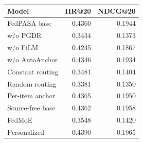 \par\noindent\begin{minipage}{\columnwidth}\centering\footnotesize
{}\label{tab:ablation}
\setlength{\tabcolsep}{1.5pt}
\begin{tabular*}{\linewidth}{@{\extracolsep{\fill}}lrr@{}}
\toprule
Model & HR@20 & NDCG@20 \\
\midrule
FedPASA base & 0.4360 & 0.1944 \\
w/o PGDR & 0.3434 & 0.1373 \\
w/o FiLM & 0.4245 & 0.1867 \\
w/o AutoAnchor & 0.4346 & 0.1934 \\
Constant routing & 0.3481 & 0.1404 \\
Random routing & 0.3381 & 0.1350 \\
Per-item anchor & 0.4365 & 0.1950 \\
Source-free base & 0.4362 & 0.1958 \\
FedMoE~\citep{mei2024fedmoe} & 0.3548 & 0.1420 \\
Personalized & 0.4390 & 0.1965 \\
\bottomrule
\end{tabular*}
\end{minipage}\par\addvspace{6pt}


